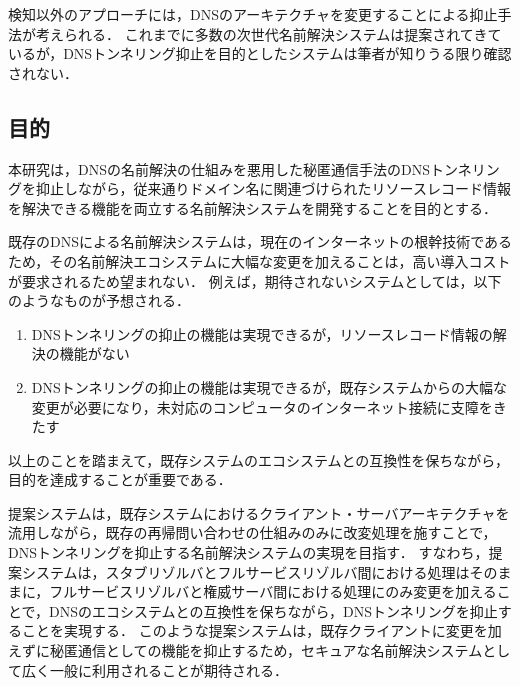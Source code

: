 検知以外のアプローチには，DNSのアーキテクチャを変更することによる抑止手法が考えられる．
これまでに多数の次世代名前解決システムは提案されてきているが，DNSトンネリング抑止を目的としたシステムは筆者が知りうる限り確認されない．


\subsection{目的}
本研究は，DNSの名前解決の仕組みを悪用した秘匿通信手法のDNSトンネリングを抑止しながら，従来通りドメイン名に関連づけられたリソースレコード情報を解決できる機能を両立する名前解決システムを開発することを目的とする．

既存のDNSによる名前解決システムは，現在のインターネットの根幹技術であるため，その名前解決エコシステムに大幅な変更を加えることは，高い導入コストが要求されるため望まれない．
例えば，期待されないシステムとしては，以下のようなものが予想される．
\begin{enumerate}
 \setlength{\itemsep}{-0.5mm}
 \item DNSトンネリングの抑止の機能は実現できるが，リソースレコード情報の解決の機能がない
 \item DNSトンネリングの抑止の機能は実現できるが，既存システムからの大幅な変更が必要になり，未対応のコンピュータのインターネット接続に支障をきたす
\end{enumerate}
以上のことを踏まえて，既存システムのエコシステムとの互換性を保ちながら，目的を達成することが重要である．

提案システムは，既存システムにおけるクライアント・サーバアーキテクチャを流用しながら，既存の再帰問い合わせの仕組みのみに改変処理を施すことで，DNSトンネリングを抑止する名前解決システムの実現を目指す．
すなわち，提案システムは，スタブリゾルバとフルサービスリゾルバ間における処理はそのままに，フルサービスリゾルバと権威サーバ間における処理にのみ変更を加えることで，DNSのエコシステムとの互換性を保ちながら，DNSトンネリングを抑止することを実現する．
このような提案システムは，既存クライアントに変更を加えずに秘匿通信としての機能を抑止するため，セキュアな名前解決システムとして広く一般に利用されることが期待される．

